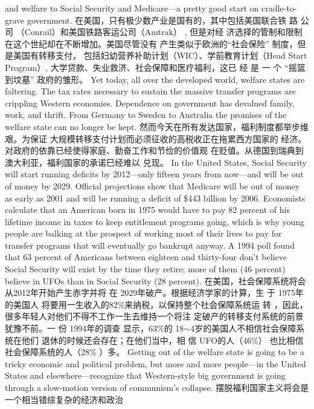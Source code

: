 \begin{paracol}{2}
and welfare to Social Security and Medicare---a pretty good
start on cradle-to-grave government.
\switchcolumn
在美国，只有极少数产业是国有的，其中包括美国联合铁
路 公 司 （Conrail）和美国铁路客运公司（Amtrak） , 但是对经
济选择的管制和限制在这个世纪却在不断增加。美国尽管没有
产生类似于欧洲的“社会保险” 制度，但是美国有转移支付，
包括妇幼营养补助计划（WIC）、学前教育计划（Head  Start Program）, 大学贷款、失业救济、社会保障和医疗福利，这已
经 是 一 个 “摇篮到坟墓” 政府的雏形。
\switchcolumn*
Yet today, all over the developed world, welfare states are faltering. The tax rates necessary to sustain the massive transfer
programs are crippling Western economies. Dependence on
government has devalued family, work, and thrift. From Germany to Sweden to Australia the promises of the welfare state can no longer be kept.
\switchcolumn
然而今天在所有发达国家，福利制度都举步维艰。为保证
大规模转移支付计划而必须征收的高税收正在拖累西方国家的
经济。对政府的依靠已经使得家庭、勤奋工作和节俭的价值观
在贬值。从德国到瑞典到澳大利亚，福利国家的承诺巳经难以
兑现。
\switchcolumn*
In the United States, Social Security will start running
deficits by 2012---only fifteen years from now---and will be out
of money by 2029. Official projections show that Medicare will
be out of money as early as 2001 and will be running a deficit of
\$443 billion by 2006. Economists calculate that an American
born in 1975 would have to pay 82 percent of his lifetime income in taxes to keep entitlement programs going, which is
why young people are balking at the prospect of working most
of their lives to pay for transfer programs that will eventually go
bankrupt anyway. A 1994 poll found that 63 percent of Americans between eighteen and thirty-four don't believe Social Security will exist by the time they retire; more of them (46
percent) believe in UFOs than in Social Security (28 percent).
\switchcolumn
在美国，社会保障系统将会从2012年开始产生赤字并将
在 2029年破产。根据经济学家的计算，生 于 1975年的美国人
将要用一生收入的82\%来纳税，以保持整个社会保障系统运
转 ，因此，很多年轻人对他们不得不工作一生去维持一个将注
定破产的转移支付系统的前景犹豫不前。一 份 1994年的调查
显示，63\%的 18$\sim$4岁的美国人不相信社会保障系统在他们
退休的时候还会存在；在他们当中，相 信 UFO的人（46\%）
也比相信社会保障系统的人（28\% ）多。
\switchcolumn*
Getting out of the welfare state is going to be a tricky economic and political problem, but more and more people---in
the United States and elsewhere---recognize that Western-style
big government is going through a slow-motion version of
communism's collapse.
\switchcolumn
摆脱福利国家主义将会是一个相当错综复杂的经济和政治

\end{paracol}
